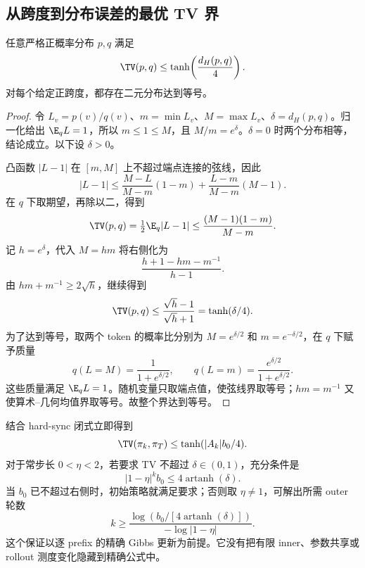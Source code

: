 \subsection{从跨度到分布误差的最优 TV 界}

\begin{theorem}
\label{thm:hs-sharp-tv}
任意严格正概率分布 $p,q$ 满足
\begin{equation}\label{eq:hs-sharp-tv}
 \TV(p,q)\leq\tanh\!\left(\frac{d_H(p,q)}4\right).
\end{equation}
对每个给定正跨度，都存在二元分布达到等号。
\end{theorem}

\begin{proof}
令 $L_v=p(v)/q(v)$、$m=\min L_v$、$M=\max L_v$、$\delta=d_H(p,q)$。归一化给出 $\E_qL=1$，所以 $m\leq1\leq M$，且 $M/m=e^\delta$。$\delta=0$ 时两个分布相等，结论成立。以下设 $\delta>0$。

凸函数 $|L-1|$ 在 $[m,M]$ 上不超过端点连接的弦线，因此
\[
 |L-1|\leq\frac{M-L}{M-m}(1-m)
 +\frac{L-m}{M-m}(M-1).
\]
在 $q$ 下取期望，再除以二，得到
\[
 \TV(p,q)=\tfrac12\E_q|L-1|
 \leq\frac{(M-1)(1-m)}{M-m}.
\]
记 $h=e^\delta$，代入 $M=hm$ 将右侧化为
\[
 \frac{h+1-hm-m^{-1}}{h-1}.
\]
由 $hm+m^{-1}\geq2\sqrt h$，继续得到
\[
 \TV(p,q)\leq\frac{\sqrt h-1}{\sqrt h+1}
 =\tanh(\delta/4).
\]
为了达到等号，取两个 token 的概率比分别为 $M=e^{\delta/2}$ 和 $m=e^{-\delta/2}$，在 $q$ 下赋予质量
\[
 q(L=M)=\frac1{1+e^{\delta/2}},\qquad
 q(L=m)=\frac{e^{\delta/2}}{1+e^{\delta/2}}.
\]
这些质量满足 $\E_qL=1$。随机变量只取端点值，使弦线界取等号；$hm=m^{-1}$ 又使算术--几何均值界取等号。故整个界达到等号。
\end{proof}

结合 hard-sync 闭式立即得到
\[
 \TV(\pi_k,\pi_T)\leq\tanh(|A_k|b_0/4).
\]
对于常步长 $0<\eta<2$，若要求 TV 不超过 $\delta\in(0,1)$，充分条件是
\[
 |1-\eta|^k b_0\leq4\operatorname{artanh}(\delta).
\]
当 $b_0$ 已不超过右侧时，初始策略就满足要求；否则取 $\eta\neq1$，可解出所需 outer 轮数
\[
 k\geq
 \frac{\log\!\left(b_0/[4\operatorname{artanh}(\delta)]\right)}
 {-\log|1-\eta|}.
\]
这个保证以逐 prefix 的精确 Gibbs 更新为前提。它没有把有限 inner、参数共享或 rollout 测度变化隐藏到精确公式中。
